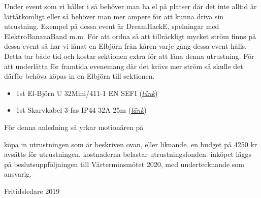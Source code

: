 \documentclass[../_main/handlingar.tex]{subfiles}
\begin{document}

Under event som vi håller i så behöver man ha el på platser där det inte alltid är
lättåtkomligt eller så behöver man mer ampere för att kunna driva sin
utrustning. Exempel på dessa event är DreamHackE, spelningar med
ElektroBananaBand m.m. För att ordna så att tillräckligt mycket ström finns på
dessa event så har vi lånat en Elbjörn från kåren varje gång dessa event hålls.
Detta tar både tid och kostar sektionen extra för att låna denna utrustning. För
att underlätta för framtida evenemang där det krävs mer ström så skulle det
därför behöva köpas in en Elbjörn till sektionen.

\begin{itemize}
    \item 1st El-Björn U 32Mini/411-1 EN SEFI (\href{https://www.proffsmagasinet.se/el-belysning/elfordelning-och-automation/byggcentral/uttagscentral/el-bjorn-u-32mini411-1-en-sefi-uttagscentral?channable=e43496.WUQxMTAxMQ&VAT=1&gclid=EAIaIQobChMI6-fYzs3Q5QIVAuR3Ch3SpwCbEAQYAyABEgISvvD_BwE}{\textit{länk}})
    \item 1st Skarvkabel 3-fas IP44 32A 25m (\href{https://www.elbutik.se/product.html/skarvkabel-3-fas-ip44}{\textit{länk}})
\end{itemize}


För denna anledning så yrkar motionären på

\begin{attsatser}
    \att köpa in utrustningen som är beskriven ovan, eller liknande.
    \att en budget på 4250 kr avsätts för utrustningen.
    \att kostnaderna belastar utrustningsfonden.
    \att inköpet läggs på beslutsuppföljningen till Vårterminsmötet 2020, med undertecknande som ansvarig.
    
\end{attsatser}

\begin{signatures}{1}
    \mvh
    \signature{Vincent Palmer}{Fritidsledare 2019}
\end{signatures}
\end{document}
